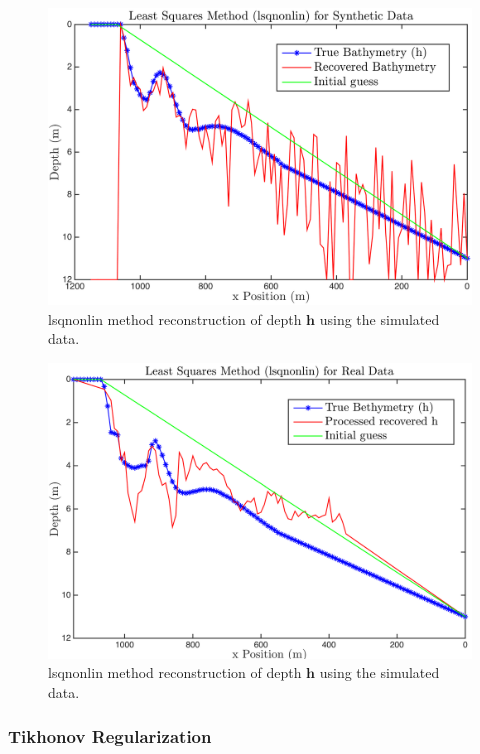 \begin{figure}[H]
\center
\includegraphics[scale=0.6]{img/lsqnonlin_simulated_10m.png} %
\caption{lsqnonlin method reconstruction of depth $\mathbf{h}$ using the simulated data.}
\label{fmincon_simulated}
\end{figure}

\begin{figure}[H]
\center
\includegraphics[scale=0.6]{img/lsqnonlin_real_data_oct09.png} %
\caption{lsqnonlin method reconstruction of depth $\mathbf{h}$ using the simulated data.}
\label{fmincon_simulated}
\end{figure}

\subsubsection{Tikhonov Regularization}

